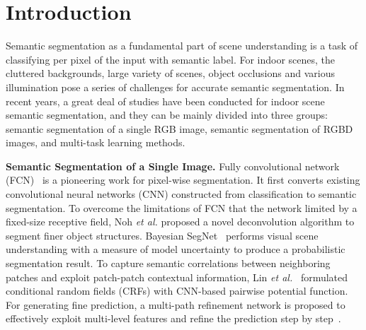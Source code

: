 \section{Introduction}
\label{sec:intro}
%

Semantic segmentation as a fundamental part of scene understanding is a task of classifying per pixel of the input with semantic label.
%
For indoor scenes, the cluttered backgrounds, large variety of scenes, object occlusions and various illumination pose a series of challenges for accurate semantic segmentation.
%
In recent years, a great deal of studies have been conducted for indoor scene semantic segmentation, and they can be mainly divided into three groups: semantic segmentation of a single RGB image, semantic segmentation of RGBD images, and multi-task learning methods.
%



\noindent \textbf{Semantic Segmentation of a Single Image.}
%
Fully convolutional network (FCN)~\cite{Long2015} is a pioneering work for pixel-wise segmentation. It first converts existing convolutional neural networks (CNN) constructed from classification to semantic segmentation.
%
To overcome the limitations of FCN that the network limited by a fixed-size receptive field, Noh \emph{et al.} \cite{Noh2015} proposed a novel deconvolution algorithm to segment finer object structures.
%
Bayesian SegNet~\cite{Kendall2015} performs visual scene understanding with a measure of model uncertainty to produce a probabilistic segmentation result.
%
To capture semantic correlations between neighboring patches and exploit patch-patch contextual information, Lin \emph{et al.}~\cite{Lin2016} formulated conditional random fields (CRFs) with CNN-based pairwise potential function. 
%
For generating fine prediction, a multi-path refinement network is proposed to effectively exploit multi-level features and refine the prediction step by step~\cite{Lin2017}.
%

